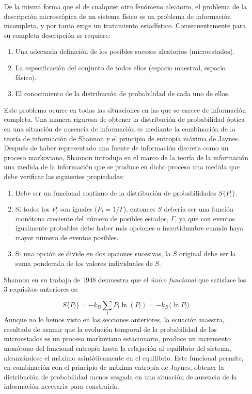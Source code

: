 \documentclass[12pt,a4paper]{article}
\numberwithin{equation}{section}
\numberwithin{figure}{section}
\theoremstyle{definition}
\begin{document}
De la misma forma que el de cualquier otro fenómeno aleatorio, el problema de la descripción microscópica de un sistema físico es un problema de información incompleta, y por tanto exige un tratamiento estadístico. Consecuentemente para su completa descripción se requiere:

\begin{enumerate}
\item Una adecuada definición de los posibles sucesos aleatorios (microestados). 
\item La especificación del conjunto de todos ellos (espacio muestral, espacio fásico).
\item El conocimiento de la distribución de probabilidad de cada uno de ellos.
\end{enumerate}
Este problema ocurre en todas las situaciones en las que se carece de información completa. Una manera rigurosa de obtener la distribución de probabilidad óptica en una situación de ausencia de información es mediante la combinación de la teoría de información de Shannon y el principio de entropía máxima de Jaynes. \\

 Después de haber representado una fuente de información discreta como un proceso markoviano, Shannon introdujo en el marco de la teoría de la información una medida de la información que se produce en dicho proceso una medida que debe verificar las siguientes propiedades:
 
\begin{enumerate}
\item Debe ser un funcional continuo de la distribución de probabilidades $S\{ P_l\}$.
\item Si todos los $P_l$ son iguales ($P_l = 1/\Gamma$), entonces $S$ debería ser una función monótona creciente del número de posibles estados, $\Gamma$, ya que con eventos igualmente probables debe haber más opciones o incertidumbre cuando haya mayor número de eventos posibles. \\
\item Si una opción se divide en dos opciones sucesivas, la $S$ original debe ser la suma ponderada de los valores individuales de $S$. 
\end{enumerate}
Shannon en su trabajo de 1948 demuestra que el \textit{único funcional} que satisface los 3 requisitos anteriores es:

\begin{equation}
S \{ P_l \} = - k_B \sum_l P_l \ln (P_l) = - k_B \langle \ln P_l \rangle
\end{equation}
Aunque no lo hemos visto en las secciones anteriores, la ecuación maestra, resultado de asumir que la evolución temporal de la probabilidad de los microestados es un proceso markoviano estacionario, produce un incremento monótono del funcional entropía hasta la relajación al equilibrio del sistema, alcanzándose el máximo asintóticamente en el equilibrio.  Este funcional permite, en combinación con el principio de máxima entropía de Jaynes, obtener la distribución de probabilidad menos sesgada en una situación de ausencia de la información necesaria para construirla. \\
\end{document}
